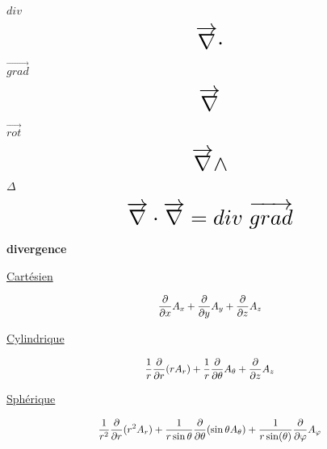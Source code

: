 \documentclass{article}
\newcommand{\vtab} {\vspace{0.4cm}}
\begin{document}
\vtab

\begin{center}
\begin{multicols}{4}
		{\Large $div$} \\
\vtab

			$$\scalebox{1.9}{$\displaystyle \overrightarrow{\nabla} \cdot$}$$

	\columnbreak
		{\Large $\overrightarrow{grad}$} \\

\vtab

			$$\scalebox{1.9}{$\displaystyle \overrightarrow{\nabla}$}$$

	
	\columnbreak
		{\Large $\overrightarrow{rot}$} \\

\vtab

			$$\scalebox{1.9}{$\displaystyle \overrightarrow{\nabla}  \wedge$}$$

	\columnbreak

	{\Large $\Delta$} \\

\vtab

			$$\scalebox{1.9}{$\displaystyle \overrightarrow{\nabla} \cdot \overrightarrow{\nabla} = div \hspace{3px} \overrightarrow{grad}$}$$


\end{multicols}
\end{center}

\vtab
\vtab


\begin{center}
	{\huge \textbf{divergence}}
\end{center}

\vtab

\begin{center}
\begin{multicols}{3}
		{\Large \underline{Cartésien}} \\
\vtab

			$$\scalebox{0.9}{$\displaystyle \frac{\partial}{\partial x} A_x + \frac{\partial}{\partial y} A_y + \frac{\partial}{\partial z} A_z$}$$

	\columnbreak
		{\Large \underline{Cylindrique}} \\

\vtab

$$\scalebox{0.9}{$\displaystyle \frac{1}{r} \frac{\partial}{\partial r} (r A_r) + \frac{1}{r}\frac{\partial}{\partial \theta} A_{\theta} + \frac{\partial}{\partial z} A_z $}$$

	
	\columnbreak
		{\Large \underline{Sphérique}} \\

\vtab

	$$\scalebox{0.9}{$\displaystyle \frac{1}{r^2} \frac{\partial}{\partial r} (r^2 A_r) + \frac{1}{r \sin \theta}\frac{\partial}{\partial \theta} (\sin \theta A_{\theta} )+ \frac{1}{r \sin (\theta)} \frac{\partial}{\partial \varphi} A_{\varphi} $}$$
\end{multicols}
\end{center}
\end{document}

